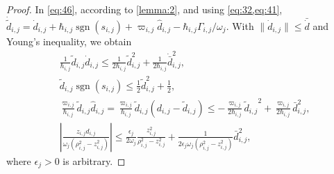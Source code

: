 \documentclass[pdflatex,sn-mathphys-num]{sn-jnl}%
\theoremstyle{thmstyleone}%
\theoremstyle{thmstyletwo}%
\theoremstyle{thmstylethree}%
\begin{document}
\begin{proof}
In \cref{eq:46}, according to \cref{lemma:2}, and using \cref{eq:32,eq:41},
$\dot{\tilde d}_{i,j}=\dot d_{i,j}+\hbar_{i,j}\operatorname{sgn}(s_{i,j})+\varpi_{i,j}\hat d_{i,j}-\hbar_{i,j}\Gamma_{i,j}/\omega_j$. With $\|\dot d_{i,j}\|\le\bar{\dot d}$ and Young’s inequality, we obtain
\begin{subequations}\label{eq:50}
\begin{align}
	&\frac{1}{\hbar_{{i,j}}} \tilde{d}_{{i,j}} \dot{d}_{{i,j}}
	\leq \frac{1}{2\hbar_{{i,j}}} \tilde{d}_{{i,j}}^2 + \frac{ 1}{2\hbar_{{i,j}}} \dot{\bar{d}}_{{i,j}}^2,\\
	&
	\tilde{d}_{{i,j}} \operatorname{sgn}(s_{{i,j}})
	\leq \frac{1}{2} \tilde{d}_{{i,j}}^2 + \frac{1}{2},\\
	&
	\frac{\varpi_{{i,j}}}{\hbar_{{i,j}}} \tilde{d}_{{i,j}} {\hat d}_{{i,j}} =\frac{\varpi_{{i,j}}}{\hbar_{{i,j}}} \tilde{d}_{{i,j}}({d}_{{i,j}}-\tilde{d}_{{i,j}})  
	 \leq -\frac{\varpi_{{i,j}}}{2 \hbar_{{i,j}}}{\tilde{d}_{{i,j}}}^2+\frac{\varpi_{{i,j}}}{2 \hbar_{{i,j}}}{{\bar d}^2_{{i,j}}},\\
	 &
	 \left| \frac{z_{{i,j}} d_{{i,j}}}{\omega_j(\rho_{{i,j}}^2 - z_{{i,j}}^2)} \right| \le
	\frac{\epsilon_j}{2 \omega_j} \frac{z_{{i,j}}^2}{\rho_{{i,j}}^2 - z_{{i,j}}^2}+\frac{1}{2\epsilon_j \omega_j  (\rho_{{i,j}}^2 - z_{{i,j}}^2)} {\bar d}^2_{{i,j}},
	\end{align}
\end{subequations}
where $\epsilon_j >0$ is arbitrary.



\end{proof}
\end{document}
